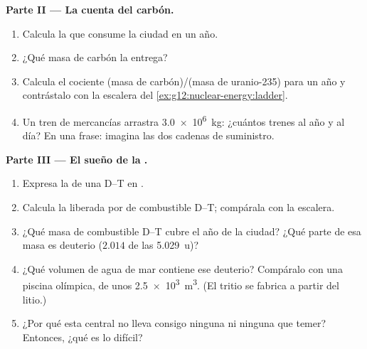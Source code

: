 \begin{problem}
\medskip
\noindent\textbf{Parte II --- La cuenta del carbón.}
\begin{enumerate}[resume]
  \item Calcula la  que consume la ciudad en un año.
  \item ¿Qué masa de carbón la entrega?
  \item Calcula el cociente (masa de carbón)/(masa de uranio-235) para un año y
        contrástalo con la escalera del \cref{ex:g12:nuclear-energy:ladder}.
  \item Un tren de mercancías arrastra \qty{3.0e6}{kg}: ¿cuántos trenes al año y al
        día? En una frase: imagina las dos cadenas de suministro.
\end{enumerate}

\medskip
\noindent\textbf{Parte III --- El sueño de la .}
\begin{enumerate}[resume]
  \item Expresa la  de una  D--T en .
  \item Calcula la  liberada por  de combustible D--T; compárala con
        la escalera.
  \item ¿Qué masa de combustible D--T cubre el año de la ciudad? ¿Qué parte de esa
        masa es deuterio ($2.014$ de las \qty{5.029}{u})?
  \item ¿Qué volumen de agua de mar contiene ese deuterio? Compáralo con una piscina
        olímpica, de unos \qty{2.5e3}{m^3}. (El tritio se fabrica a partir del litio.)
  \item ¿Por qué esta central no lleva consigo ninguna  ni ninguna
         que temer? Entonces, ¿qué es lo difícil?
\end{enumerate}


\end{problem}
